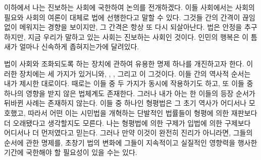 이하에서 나는 진보하는 사회에 국한하여 논의를 전개하겠다.
이들 사회에서는 사회의 필요와 사회의 여론이 대체로 법에 선행한다고
말할 수 있다.
그것들 간의 간격이 끊임없이 메워지는 경향을 보이지만,
그 간격은 항상 또 다시 되살아난다.
법은 안정을 추구하지만, 지금 우리가 말하고 있는 사회는 진보하는 사회인 것이다.
인민의 행복은 이 틈새가 얼마나 신속하게 좁혀지는가에 달려있다.

법이 사회와 조화되도록 하는 장치에 관하여 유용한 명제 하나를
개진하고자 한다.
이러한 장치에는 세 가지가 있거니와,
, ,
그리고 이 그것이다.
이들 간의 역사적 순서는 내가 제시한 대로이다.
때로는 이들 중 두 가지가 동시에 작용하기도 하고, 또
이들 중 하나의 영향을 받지 않은 법체계도 존재한다.
그러나 내가 아는 한 이들의 등장 순서가 뒤바뀐 사례는 존재하지 않는다.
이들 중 하나인 형평법은 그 초기 역사가 어디서나 모호했고,
따라서 어떤 이는 시민법을 개혁하는 단발적인 법률들이 형평에 의한 재판보다
더 오래됐다고 생각할지도 모른다.
나는 형평법에 의한 구제가 입법에 의한 구제보다 어디서나 더 먼저였다고 믿는다.
그러나 만약 이것이 완전히 진리가 아니라면,
그들의 순서에 관한 명제를,
초창기 법의 변화에 그들이 지속적이고 실질적인
영향력을 행사한 기간에
국한해야 할 필요성이 있을 수는 있다.

